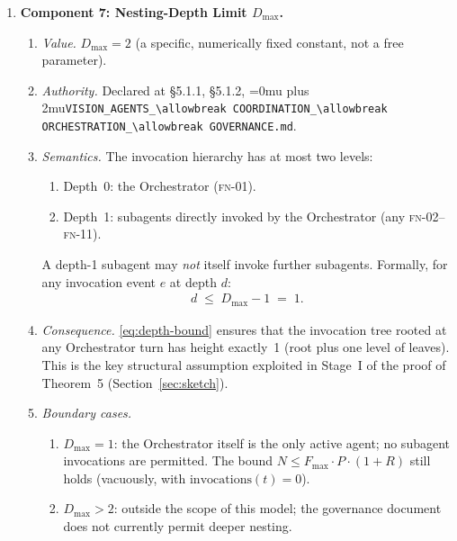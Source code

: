 \documentclass[12pt]{article}
\theoremstyle{definition}
\DeclareRobustCommand{\code}[1]{\begingroup\Urlmuskip=0mu plus 2mu\relax\nolinkurl{#1}\endgroup}
\newcommand{\FN}[1]{\textsc{fn-#1}}
\newcommand{\VisionGov}{\code{VISION\_AGENTS\_\allowbreak COORDINATION\_\allowbreak ORCHESTRATION\_\allowbreak GOVERNANCE.md}}
\begin{document}
\begin{enumerate}
  \item \textbf{Component 7: Nesting-Depth Limit $D_{\max}$.}
  \begin{enumerate}
    \item[7.1] \emph{Value.}
               $D_{\max} = 2$ (a specific, numerically fixed constant,
               not a free parameter).
    \item[7.2] \emph{Authority.}
               Declared at \S5.1.1, \S5.1.2,
               \VisionGov{}.
    \item[7.3] \emph{Semantics.}
               The invocation hierarchy has at most two levels:
               \begin{enumerate}
                 \item[(a)] Depth~0: the Orchestrator (\FN{01}).
                 \item[(b)] Depth~1: subagents directly invoked by the
                            Orchestrator (any \FN{02}--\FN{11}).
               \end{enumerate}
               A depth-1 subagent may \emph{not} itself invoke further
               subagents.  Formally, for any invocation event $e$ at
               depth $d$:
               \begin{align}
                 d \;\leq\; D_{\max} - 1 \;=\; 1.
                 \label{eq:depth-bound}
               \end{align}
    \item[7.4] \emph{Consequence.}
               \eqref{eq:depth-bound} ensures that the invocation tree
               rooted at any Orchestrator turn has height exactly~1
               (root plus one level of leaves).  This is the key
               structural assumption exploited in Stage~I of the proof
               of Theorem~5 (Section~\ref{sec:sketch}).
    \item[7.5] \emph{Boundary cases.}
               \begin{enumerate}
                 \item[(a)] $D_{\max} = 1$: the Orchestrator itself
                            is the only active agent; no subagent
                            invocations are permitted.  The bound
                            $N \leq F_{\max} \cdot P \cdot (1+R)$
                            still holds (vacuously, with
                            $\mathrm{invocations}(t) = 0$).
                 \item[(b)] $D_{\max} > 2$: outside the scope of this
                            model; the governance document does not
                            currently permit deeper nesting.
               \end{enumerate}
  \end{enumerate}
\end{enumerate}
\end{document}

